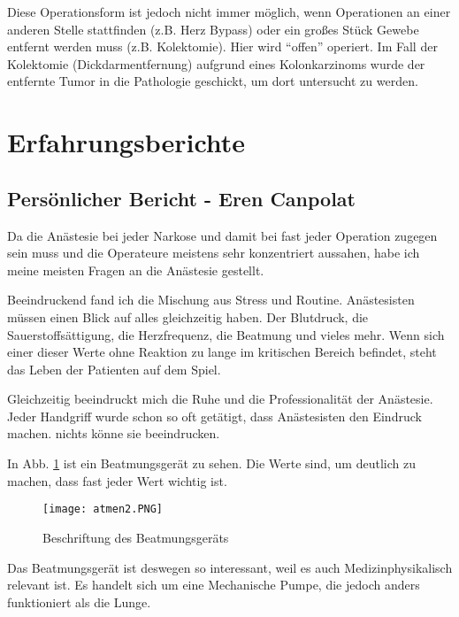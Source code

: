 \documentclass[11pt,a4paper,titlepage]{scrartcl}
\begin{document}
Diese Operationsform ist jedoch nicht immer möglich, wenn Operationen an einer anderen Stelle stattfinden (z.B. Herz Bypass) oder ein großes Stück Gewebe entfernt werden muss (z.B. Kolektomie). Hier wird \enquote{offen} operiert. Im Fall der Kolektomie (Dickdarmentfernung) aufgrund eines Kolonkarzinoms wurde der entfernte Tumor in die Pathologie geschickt, um dort untersucht zu werden. \medskip






\newpage
\section{Erfahrungsberichte}
\subsection{Persönlicher Bericht - Eren Canpolat}

Da die Anästesie bei jeder Narkose und damit bei fast jeder Operation zugegen sein muss und die Operateure meistens sehr konzentriert aussahen, habe ich meine meisten Fragen an die Anästesie gestellt. \medskip

Beeindruckend fand ich die Mischung aus Stress und Routine. Anästesisten müssen einen Blick auf alles gleichzeitig haben. Der Blutdruck, die Sauerstoffsättigung, die Herzfrequenz, die Beatmung und vieles mehr. Wenn sich einer dieser Werte ohne Reaktion zu lange im kritischen Bereich befindet, steht das Leben der Patienten auf dem Spiel. \medskip

Gleichzeitig beeindruckt mich die Ruhe und die Professionalität der Anästesie. Jeder Handgriff wurde schon so oft getätigt, dass Anästesisten den Eindruck machen. nichts könne sie beeindrucken.\medskip

In Abb. \ref{fig:Beatmung} ist ein Beatmungsgerät zu sehen. Die Werte sind, um deutlich zu machen, dass fast jeder Wert wichtig ist. \medskip

 \begin{figure}
        \centering
        \texttt{[image: atmen2.PNG]}
        \caption{Beschriftung des Beatmungsgeräts}
        \label{fig:Beatmung}
        \centering
        \end{figure}
\newpage

Das Beatmungsgerät ist deswegen so interessant, weil es auch Medizinphysikalisch relevant ist. Es handelt sich um eine Mechanische Pumpe, die jedoch anders funktioniert als die Lunge. \medskip
\end{document}

